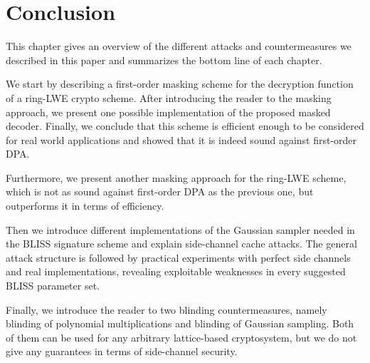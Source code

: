 \chapter{Conclusion}
This chapter gives an overview of the different attacks and countermeasures we described in this paper and summarizes the bottom line of each chapter.

We start by describing a first-order masking scheme for the decryption function of a \ac{ring-LWE} crypto scheme. After introducing the reader to the masking approach, we present one possible implementation of the proposed masked decoder. Finally, we conclude that this scheme is efficient enough to be considered for real world applications and showed that it is indeed sound against first-order \ac{DPA}.

Furthermore, we present another masking approach for the \ac{ring-LWE} scheme, which is not as sound against first-order \ac{DPA} as the previous one, but outperforms it in terms of efficiency.

Then we introduce different implementations of the Gaussian sampler needed in the \ac{BLISS} signature scheme and explain side-channel cache attacks. The general attack structure is followed by practical experiments with perfect side channels and real implementations, revealing exploitable weaknesses in every suggested \ac{BLISS} parameter set.

Finally, we introduce the reader to two blinding countermeasures, namely blinding of polynomial multiplications and blinding of Gaussian sampling. Both of them can be used for any arbitrary lattice-based cryptosystem, but we do not give any guarantees in terms of side-channel security.


